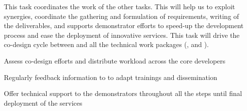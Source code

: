 \begin{task}[
  title=Co-design and technical support,
  id=codesign-support,
  lead=SRL,
  PM=15,
  wphases={1-48},
  partners={XFEL,EGI,CDS,INSERM,QS,SIL,UIO,UPSUD,WTT,EP}
]


This task coordinates the work of the other 
tasks. This will help us to exploit synergies, coordinate the
gathering and formulation of requirements,
writing of the deliverables, and supports demonstrator efforts to
speed-up the development process and ease the deployment of innovative
services. This task will drive the co-design cycle between
 and all the technical work packages
(,  and ).

\begin{compactitem}
\item Assess co-design efforts and distribute workload across the core
  developers
\item Regularly feedback information to  to adapt
  trainings and dissemination
\item Offer technical support to the demonstrators throughout all the
  steps until final deployment of the services
\end{compactitem}

\end{task}
